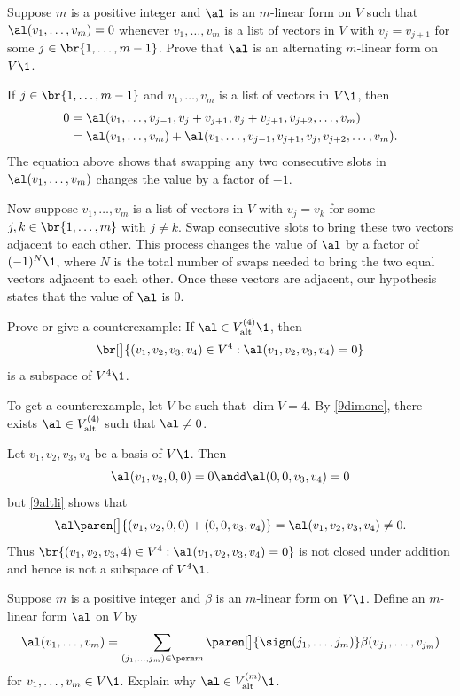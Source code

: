 \exercise
Suppose $m$ is a positive integer and $\al$ is an $m$-linear form on $V$ such that $\al(v_1, \ldots, v_m) = 0$ whenever
$v_1, \ldots, v_m$ is a list of vectors in $V$ with $v_j = v_{j+1}$ for some $j \in \br{1, \ldots, m-1}$. Prove that $\al$ is an alternating $m$-linear form on~$V\1$.

\begin{Solution}
If $j \in \br{1, \ldots, m-1}$ and $v_1, \ldots, v_m$ is a list of vectors in $V\1$, then
\begin{align*}
0 &= \al( v_1, \ldots, v_{j-1}, v_j + v_{j+1}, v_j + v_{j+1}, v_{j+2}, \ldots, v_m) \\
&= \al( v_1, \ldots, v_m) + \al( v_1, \ldots, v_{j-1}, v_{j+1}, v_j, v_{j+2}, \ldots, v_m).
\end{align*}
The equation above shows that swapping any two consecutive slots in $\al( v_1, \ldots, v_m)$ changes the value by a factor of $-1$.

Now suppose $v_1, \ldots, v_m$ is a list of vectors in $V$ with $v_j = v_k$ for some $j, k \in \br{1, \ldots, m}$ with $j \ne k$. Swap consecutive slots to bring these two vectors adjacent to each other. This process changes the value of $\al$ by a factor of $(-1)^N\1$, where $N$ is the total number of swaps needed to bring the two equal vectors adjacent to each other. Once these vectors are adjacent, our hypothesis states that the value of $\al$ is $0$.
\end{Solution}

\exercise
Prove or give a counterexample: If $\al \in V_\text{alt}^{(4)}\1$, then
\[
\br[\big]{ (v_1, v_2, v_3, v_4) \in V^4 : \al(v_1, v_2, v_3, v_4) = 0 }
\]
is a subspace of $V^4\1$.

\begin{Solution}
To get a counterexample, let $V$ be such that $\dim V = 4$. By \ref{9dimone}, there exists $\al \in V^{(4)}_\text{alt}$ such that $\al \ne 0$.

Let $v_1, v_2, v_3, v_4$ be a basis of $V\1$. Then
\[
\al(v_1, v_2, 0, 0) = 0 \andd \al(0, 0, v_3, v_4) = 0
\]
but \ref{9altli} shows that
\[
\al\paren[\big]{ (v_1, v_2, 0, 0) + (0, 0, v_3, v_4) } = \al(v_1, v_2, v_3, v_4) \ne 0.
\]
Thus $\br{ (v_1, v_2, v_3, 4) \in V^4 : \al(v_1, v_2, v_3, v_4) = 0 }$ is not closed under addition and hence is not a subspace of $V^4\1$.
\end{Solution}

\exercise
Suppose $m$ is a positive integer and $\beta$ is an $m$-linear form on $V\1$. Define an $m$-linear form $\al$ on $V$ by
\[
\al(v_1, \ldots, v_m) =
\sum_{(j_1, \ldots, j_m) \in \perm m} \paren[\big]{ \sign(j_1, \ldots, j_m) } \beta( v_{j_1}, \ldots, v_{j_m} )
\]
for $v_1, \ldots, v_m \in V\1$. Explain why $\al \in V_{\text{alt}}^{(m)}\1$.

